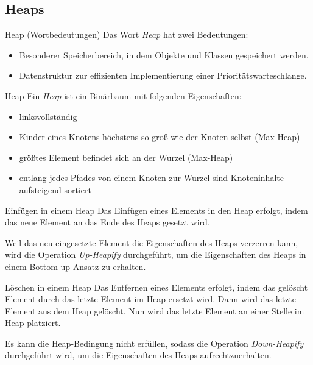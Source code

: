 \subsection{Heaps}

\begin{bonus}{Heap (Wortbedeutungen)}
    Das Wort \emph{Heap} hat zwei Bedeutungen:
    \begin{itemize}
        \item Besonderer Speicherbereich, in dem Objekte und Klassen gespeichert werden.
        \item Datenstruktur zur effizienten Implementierung einer Prioritätswarteschlange.
    \end{itemize}
\end{bonus}

\begin{defi}{Heap}
    Ein \emph{Heap} ist ein Binärbaum mit folgenden Eigenschaften:
    \begin{itemize}
        \item linksvollständig
        \item Kinder eines Knotens höchstens so groß wie der Knoten selbst (Max-Heap)
        \item größtes Element befindet sich an der Wurzel (Max-Heap)
        \item entlang jedes Pfades von einem Knoten zur Wurzel sind Knoteninhalte aufsteigend sortiert
    \end{itemize}
\end{defi}

\begin{algo}{Einfügen in einem Heap}
    Das Einfügen eines Elements in den Heap erfolgt, indem das neue Element an das Ende des Heaps gesetzt wird.

    Weil das neu eingesetzte Element  die Eigenschaften des Heaps verzerren kann, wird die Operation \emph{Up-Heapify} durchgeführt, um die Eigenschaften des Heaps in einem Bottom-up-Ansatz zu erhalten.
\end{algo}

\begin{algo}{Löschen in einem Heap}
    Das Entfernen eines Elements erfolgt, indem das gelöscht Element durch das letzte Element im Heap ersetzt wird. Dann wird das letzte Element aus dem Heap gelöscht. Nun wird das letzte Element an einer Stelle im Heap platziert.

    Es kann die Heap-Bedingung nicht erfüllen, sodass die Operation \emph{Down-Heapify} durchgeführt wird, um die Eigenschaften des Heaps aufrechtzuerhalten.
\end{algo}

